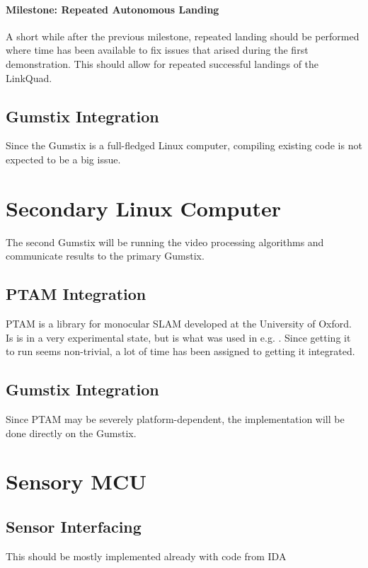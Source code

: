             \paragraph{Milestone: Repeated Autonomous Landing \newline}
                A short while after the previous milestone, repeated landing
                should be performed where time has been available to fix
                issues that arised during the first demonstration.
                This should allow for repeated successful landings of the LinkQuad.

    \subsection{Gumstix Integration}
        Since the Gumstix is a full-fledged Linux computer,
        compiling existing code is not expected to be a big issue.

\section{Secondary Linux Computer}
    The second Gumstix will be running the video processing algorithms
    and communicate results to the primary Gumstix.

    \subsection{PTAM Integration}
        PTAM is a library for monocular SLAM developed at the University of Oxford.
        Is is in a very experimental state, but is what was used in e.g.
        \citep{klein07parallel,weiss11monocular}.
        Since getting it to run seems non-trivial, a lot of time has been assigned
        to getting it integrated.

    \subsection{Gumstix Integration}
        Since PTAM may be severely platform-dependent, the implementation
        will be done directly on the Gumstix.

\section{Sensory MCU}
    \subsection{Sensor Interfacing}
        This should be mostly implemented already with code from IDA

